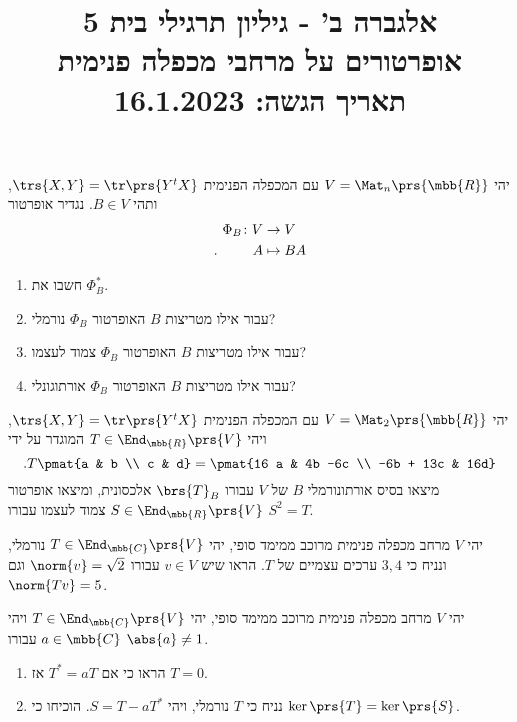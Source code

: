 \documentclass[a4paper,10pt,twoside,openany]{article}
\title{
אלגברה ב' - גיליון תרגילי בית 5 \\
אופרטורים על מרחבי מכפלה פנימית
\\
\vspace{1cm}
\large{תאריך הגשה: 16.1.2023}
}
\date{}
\begin{document}
\maketitle

\begin{exercise}
יהי
$V = \Mat_n\prs{\mbb{R}}$
עם המכפלה הפנימית
$\trs{X,Y} = \tr\prs{Y^t X}$,
ותהי
$B \in V$.
נגדיר אופרטור
\begin{align*}
\Phi_B \colon V &\to V \\
\text{.} \hphantom{lalala} A &\mapsto BA
\end{align*}
\begin{enumerate}
\item
חשבו את
$\Phi_B^*$.
\item
עבור אילו מטריצות
$B$
האופרטור
$\Phi_B$
נורמלי?
\item
עבור אילו מטריצות
$B$
האופרטור
$\Phi_B$
צמוד לעצמו?
\item
עבור אילו מטריצות
$B$
האופרטור
$\Phi_B$
אורתוגונלי?
\end{enumerate}
\end{exercise}

\begin{exercise}
יהי
$V = \Mat_2\prs{\mbb{R}}$
עם המכפלה הפנימית
$\trs{X,Y} = \tr\prs{Y^t X}$,
ויהי
$T \in \End_{\mbb{R}}\prs{V}$
המוגדר על ידי
\[\text{.} T\pmat{a & b \\ c & d} = \pmat{16 a & 4b -6c \\ -6b + 13c & 16d}\]
מיצאו בסיס אורתונורמלי
$B$
של
$V$
עבורו
$\brs{T}_B$
אלכסונית, ומיצאו אופרטור
$S \in \End_{\mbb{R}}\prs{V}$
צמוד לעצמו עבורו
$S^2 = T$.
\end{exercise}

\begin{exercise}
יהי
$V$
מרחב מכפלה פנימית מרוכב ממימד סופי, יהי
$T \in \End_{\mbb{C}}\prs{V}$
נורמלי, ונניח כי
$3,4$
ערכים עצמיים של
$T$.
הראו שיש
$v \in V$
עבורו
$\norm{v} = \sqrt{2}$
וגם
$\norm{Tv} = 5$.
\end{exercise}

\begin{exercise}
יהי
$V$
מרחב מכפלה פנימית מרוכב ממימד סופי, יהי
$T \in \End_{\mbb{C}}\prs{V}$
ויהי
$a \in \mbb{C}$
עבורו
$\abs{a} \neq 1$.

\begin{enumerate}
\item הראו כי אם
$T^* = aT$
אז
$T = 0$.

\item נניח כי
$T$
נורמלי, ויהי
$S = T - a T^*$.
הוכיחו כי
$\ker\prs{T} = \ker\prs{S}$.
\end{enumerate}
\end{exercise}
\end{document}
